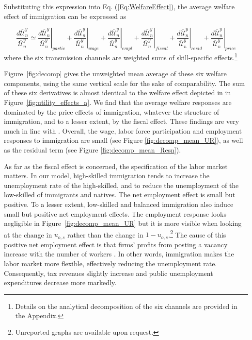 \documentclass[a4paper,12pt]{article}
\begin{document}
Substituting this expression into Eq. (\ref{Eq:WelfareEffect}), the average welfare effect of immigration can be expressed as

\begin{equation}
\frac{d\overline{\mathcal{U}}_{n}^{y}}{\overline{\mathcal{U}}_{n}^{y}}\simeq \left. \frac{d\overline{\mathcal{U}}_{n}^{y}}{\overline{\mathcal{U}}_{n}^{y}}\right \vert_{partic}+\left. 
\frac{d\overline{\mathcal{U}}_{n}^{y}}{\overline{\mathcal{U}}_{n}^{y}}\right \vert_{wage}+\left. 
\frac{d\overline{\mathcal{U}}_{n}^{y}}{\overline{\mathcal{U}}_{n}^{y}}\right \vert_{empl}+\left. 
\frac{d\overline{\mathcal{U}}_{n}^{y}}{\overline{\mathcal{U}}_{n}^{y}}\right \vert_{fiscal}+\left. \frac{d\overline{\mathcal{U}}_{n}^{y}}{\overline{\mathcal{U}}_{n}^{y}}\right \vert _{resid}+\left. \frac{d\overline{\mathcal{U}}_{n}^{y}}{\overline{\mathcal{U}}_{n}^{y}}\right \vert _{price}
\label{Eq:DecompPrivateCons2}
\end{equation}
where the six transmission channels are weighted sums of skill-specific effects.\footnote{Details on the analytical decomposition of the six channels are provided in the Appendix.}

Figure~\ref{fig:decomp} gives the unweighted mean average of these six welfare components, using the same vertical scale for the sake of comparability. The sum of these six derivatives is almost identical to the welfare effect depicted in in Figure~\ref{fig:utility_effects_a}. We find that the average welfare responses are dominated by the price effects of immigration, whatever the structure of immigration, and to a lesser extent, by the fiscal effect. These findings are very much in line with \citet{Aubry2016}. Overall, the wage, labor force participation and employment responses to immigration are small (see Figure \ref{fig:decomp_mean_UR}), as well as the residual term (see Figure \ref{fig:decomp_mean_Resn}).

As far as the fiscal effect is concerned, the specification of the labor market matters. In our model, high-skilled immigration tends to increase the unemployment rate of the high-skilled, and to reduce the unemployment of the low-skilled of immigrants and natives. The net employment effect is small but positive. To a lesser extent, low-skilled and balanced immigration also induce small but positive net employment effects. The employment response looks negligible in Figure~\ref{fig:decomp_mean_UR} but it is more visible when looking at the change in $u_{o,s}$ rather than the change in $1-u_{o,s}$.\footnote{Unreported graphs are available upon request.} The cause of this positive net employment effect is that firms' profits from posting a vacancy increase with the number of workers \citep[as in][]{Battisti2018}. In other words, immigration  makes the  labor market  more  flexible,  effectively  reducing  the  unemployment  rate. Consequently, tax revenues slightly increase and public unemployment expenditures decrease more markedly.
\end{document}
